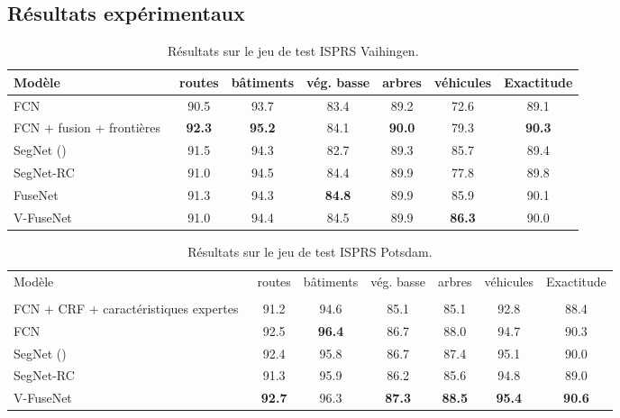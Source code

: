 \subsection{Résultats expérimentaux}


\begin{table}
    \caption{Résultats sur le jeu de test \gls{ISPRS} Vaihingen.}
    \label{table:final_vaihingen}
    \setlength\tabcolsep{5pt}
	\begin{tabularx}{\textwidth}{Y c c c c c c}
    \toprule
	  Modèle & routes & bâtiments & vég. basse & arbres & véhicules & Exactitude\\
    \midrule
    FCN~\cite{sherrah_fully_2016} & 90.5 & 93.7 & 83.4 & 89.2 & 72.6 & 89.1\\
    FCN + fusion + frontières~\cite{marmanis_classification_2017} & \textbf{92.3} & \textbf{95.2} & 84.1 & \textbf{90.0} & 79.3 & \textbf{90.3}\\
    \midrule
    SegNet () & 91.5 & 94.3 & 82.7 & 89.3 & 85.7 & 89.4\\
	  SegNet-RC & 91.0 & 94.5 & 84.4 & 89.9 & 77.8 & 89.8\\
    FuseNet & 91.3 & 94.3 & \textbf{84.8} & 89.9 & 85.9 & 90.1\\
    V-FuseNet & 91.0 & 94.4 & 84.5 & 89.9 & \textbf{86.3} & 90.0\\
    \bottomrule
    \end{tabularx}
\end{table}

\begin{table}
    \caption{Résultats sur le jeu de test \gls{ISPRS} Potsdam.}
    \label{table:final_potsdam}
    \setlength\tabcolsep{4pt}
	\begin{tabularx}{\textwidth}{Y c c c c c c}
    \toprule
  	Modèle & routes & bâtiments & vég. basse & arbres & véhicules & Exactitude\\\\
    \midrule
    FCN + CRF + caractéristiques expertes~\cite{liu_dense_2017} & 91.2 & 94.6 & 85.1 & 85.1 & 92.8 & 88.4\\
    FCN~\cite{sherrah_fully_2016} & 92.5 & \textbf{96.4} & 86.7 & 88.0 & 94.7 & 90.3\\
    \midrule
    SegNet () & 92.4 & 95.8 & 86.7 & 87.4 & 95.1 & 90.0\\
	  SegNet-RC & 91.3 & 95.9 & 86.2 & 85.6 & 94.8 & 89.0\\
    V-FuseNet & \textbf{92.7} & 96.3 & \textbf{87.3} & \textbf{88.5} & \textbf{95.4} & \textbf{90.6}\\
    \bottomrule
    \end{tabularx}
\end{table}


